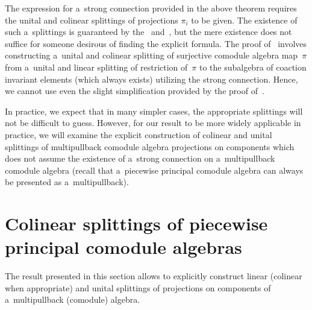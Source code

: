 \documentclass[11pt]{article}
\begin{document}
The expression for a~strong connection provided in the above theorem requires the unital and colinear splittings of
projections $\pi_i$ to be given.
The existence of such a~splittings is guaranteed by the~\cite[Lemma~3.1]{hkmz11} and~\cite[Theorem~3.3]{hkmz11}, but the
mere existence does not suf\/f\/ice for someone desirous of f\/inding the explicit formula.
The proof of~\cite[Lemma~3.1]{hkmz11} involves constructing a~unital and colinear splitting of surjective comodule
algebra map~$\pi$ from a~unital and linear splitting of restriction of~$\pi$ to the subalgebra of coaction invariant
elements (which always exists) utilizing the strong connection.
Hence, we cannot use even the slight simplif\/ication provided by the proof of~\cite[Lemma~3.1]{hkmz11}.

In practice, we expect that in many simpler cases, the appropriate splittings will not be dif\/f\/icult to guess.
However, for our result to be more widely applicable in practice, we will examine the explicit construction of colinear
and unital splittings of multipullback comodule algebra projections on components which does not assume the existence of
a~strong connection on a~multipullback comodule algebra (recall that a~piecewise principal comodule algebra can always
be presented as a~multipullback).

\section{Colinear splittings of piecewise principal comodule algebras}\label{colinear-section}

The result presented in this section allows to explicitly construct linear (colinear when approp\-riate) and unital
splittings of projections on components of a~multipullback (comodule) algebra.
\end{document}
